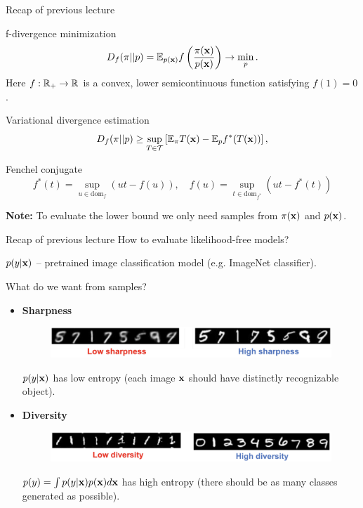 \begin{frame}{Recap of previous lecture}
	\vspace{-0.3cm}
	\begin{block}{f-divergence minimization}
		\vspace{-0.3cm}
		\[
			D_f(\pi || p) = \mathbb{E}_{p(\mathbf{x})}  f\left( \frac{\pi(\mathbf{x})}{p(\mathbf{x})} \right) \rightarrow \min_p.
		\]
		Here $f: \mathbb{R}_+ \rightarrow \mathbb{R}$ is a convex, lower semicontinuous function satisfying $f(1) = 0$.
	\end{block}
	\begin{block}{Variational divergence estimation}
		\vspace{-0.3cm}
		\[
			D_f(\pi || p) \geq \sup_{T \in \mathcal{T}} \left[\mathbb{E}_{\pi}T(\mathbf{x}) -  \mathbb{E}_p f^*(T(\mathbf{x})) \right],
		\]
		\vspace{-0.7cm}
	\end{block}
	\begin{block}{Fenchel conjugate}
		\vspace{-0.7cm}
		\[
		f^*(t) = \sup_{u \in \text{dom}_f} \left( ut - f(u) \right), \quad f(u) = \sup_{t \in \text{dom}_{f^*}} \left( ut - f^*(t) \right)
		\]
		\vspace{-0.5cm}
	\end{block}
	\textbf{Note:} To evaluate the lower bound we only need samples from $\pi(\mathbf{x})$ and $p(\mathbf{x})$. 
\end{frame}
\begin{frame}{Recap of previous lecture}
	How to evaluate likelihood-free models?
	
	$p(y | \mathbf{x})$ -- pretrained image classification model (e.g. ImageNet classifier).
	\begin{block}{What do we want from samples?}
		\begin{itemize}
			\item \textbf{Sharpness}
			\begin{figure}
				\centering
				\includegraphics[width=0.9\linewidth]{figs/sharpness}
			\end{figure}
			$p(y | \mathbf{x})$ has low entropy (each image $\mathbf{x}$ should have distinctly recognizable object).
			\item \textbf{Diversity}
			\begin{figure}
				\centering
				\includegraphics[width=0.9\linewidth]{figs/diversity}
			\end{figure}
			$p(y) = \int p(y | \mathbf{x}) p(\mathbf{x}) d \mathbf{x}$ has high entropy (there should be as many classes generated as possible).
		\end{itemize}
	\end{block}
\end{frame}
